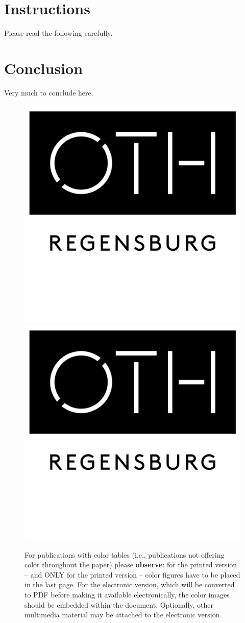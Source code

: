 \section{Instructions}

Please read the following carefully.

\newpage


\section{Conclusion}

Very much to conclude here.

\newpage

\begin{figure}[tbp]
  \centering
  \mbox{} \hfill
  \includegraphics[width=.3\linewidth]{oth.png}
  \hfill
  \includegraphics[width=.3\linewidth]{oth.png}
  \hfill \mbox{}
  \caption{\label{fig:ex3}%
           For publications with color tables (i.e., publications not offering
           color throughout the paper) please \textbf{observe}:
           for the printed version -- and ONLY for the printed
           version -- color figures have to be placed in the last page.
           \newline
           For the electronic version, which will be converted to PDF before
           making it available electronically, the color images should be
           embedded within the document. Optionally, other multimedia
           material may be attached to the electronic version. }
\end{figure}


